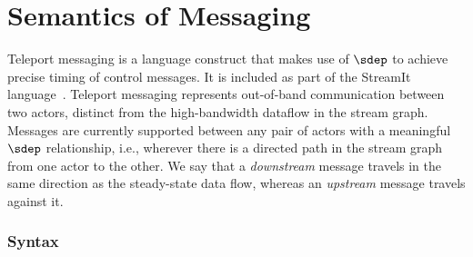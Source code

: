 



\section{Semantics of Messaging}
\label{sec:teleport}


Teleport messaging is a language construct that makes use of $\sdep$
to achieve precise timing of control messages.  It is included as part
of the StreamIt language~\cite{streamitcc}.  Teleport messaging
represents out-of-band communication between two actors, distinct from
the high-bandwidth dataflow in the stream graph.  Messages are
currently supported between any pair of actors with a meaningful
$\sdep$ relationship, i.e., wherever there is a directed path in the
stream graph from one actor to the other.  We say that a {\it
downstream} message travels in the same direction as the steady-state
data flow, whereas an {\it upstream} message travels against it.

\subsubsection*{Syntax}

